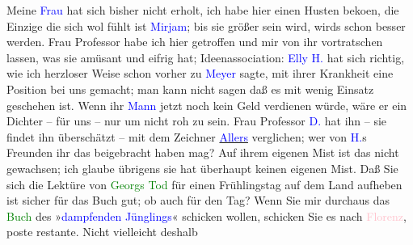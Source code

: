            \pstart
           Meine \textcolor{blue}{Frau}{} hat sich bisher
               nicht erholt, ich habe hier einen Husten beko{\geminationm}en, die
               Einzige die sich wol fühlt ist \textcolor{blue}{Mirjam}{}\ledrightnote{\textcolor{blue}{Mirjam Beer-Hofmann}}; bis sie
               größer sein wird, wirds schon besser werden. Frau Professor \label{K_L01016_2v}\label{K_L01016_2h} habe ich hier getroffen
               und mir von ihr vortratschen lassen, was sie amüsant und eifrig hat;
               Ideenassociation: \textcolor{blue}{Elly H.}{}\ledrightnote{\textcolor{blue}{Elly Petersen}} hat sich richtig, wie
               ich herzloser Weise schon vorher zu \textcolor{blue}{Meyer}{}\ledrightnote{\textcolor{blue}{Oskar Mayer}} sagte, mit ihrer Krankheit eine {\pb}Position bei uns gemacht; man kann
               nicht sagen daß es mit wenig Einsatz geschehen ist. Wenn ihr \textcolor{blue}{Mann}{} jetzt noch kein Geld verdienen würde,
               wäre er ein Dichter – für uns – nur um nicht roh zu sein. Frau Professor \textcolor{blue}{D.}{}\ledrightnote{\textcolor{blue}{Berta Doepler}} hat ihn – sie findet ihn überschätzt – mit dem
               Zeichner \uline{\textcolor{blue}{Allers}{}\ledrightnote{\textcolor{blue}{Christian Wilhelm Allers}}} verglichen; wer von \textcolor{blue}{H.}{}\ledrightnote{\textcolor{blue}{Georg Hirschfeld}}s Freunden ihr das
               beigebracht haben mag? Auf ihrem eigenen Mist ist das nicht gewachsen; ich glaube
               übrigens sie hat überhaupt keinen eigenen Mist. Daß Sie sich die Lektüre von \textcolor{green}{Georgs Tod}{}\ledrightnote{\textcolor{green}{Der Tod Georgs}} für einen Frühlingstag auf dem Land
               aufheben ist sicher für das Buch gut; ob auch für den Tag? Wenn Sie mir durchaus das
                  \textcolor{green}{Buch}{} des »\textcolor{blue}{dampfenden Jünglings}{}« schicken wollen, schicken
               Sie es nach \textcolor{pink}{Florenz}{}\ledrightnote{\textcolor{pink}{Florenz}}, poste {\pb}restante. Nicht vielleicht deshalb
